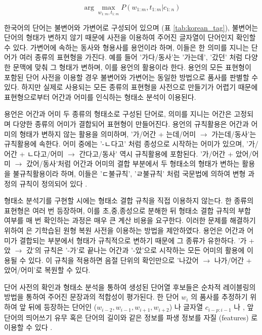 \documentclass[oneside, ko,phd]{snuthesis_utf8_kor}
\begin{document}
\begin{equation}
\label{eq:korean_pos_obj}
\arg \max_{w_{1:m},t_{1:m}} P(w_{1:m}, t_{1:m} \vert c_{1:n})
\end{equation}

한국어의 단어는 불변어와 가변어로 구성되어 있으며 (표 \ref{tab:korean_tag}), 불변어는 단어의 형태가 변하지 않기 때문에 사전을 이용하여 주어진 글자열이 단어인지 확인할 수 있다.
가변어에 속하는 동사와 형용사를 용언이라 하며, 이들은 한 의미를 지니는 단어가 여러 종류의 표현형을 가진다.
예를 들어 '가다/동사'는 '가는데', '갔던' 처럼 다양한 문맥에 맞춰 그 형태가 변하며, 이를 용언의 활용이라 한다.
용언의 모든 표현형이 포함된 단어 사전을 이용할 경우 불변어와 가변어는 동일한 방법으로 품사를 판별할 수 있다.
하지만 실제로 사용되는 모든 종류의 표현형을 사전으로 만들기가 어렵기 때문에 표현형으로부터 어간과 어미를 인식하는 형태소 분석이 이용된다.

용언은 어간과 어미 두 종류의 형태소로 구성된 단어로, 의미를 지니는 어간은 고정되며 다양한 종류의 어미가 결합되어 표현형이 만들어진다.
용언의 규칙활용은 어간과 어미의 형태가 변하지 않는 활용을 의미하며, '가/어간 + 는데/어미 $\rightarrow$ 가는데/동사'는 규칙활용에 속한다.
어미 중에는 '-ㄴ다고' 처럼 종성으로 시작하는 어미가 있으며, '가/어간 + ㄴ다고/어미 $\rightarrow$ 간다고/동사' 역시 규칙활용에 포함된다.
'가/어간 + 았어/어미 $\rightarrow$ 갔어/동사'처럼 어간과 어미의 결합 부분에서 두 형태소의 형태가 변하는 활용을 불규칙활용이라 하며, 이들은 'ㄷ불규칙', 'ㄹ불규칙' 처럼 국문법에 의하여 변형 과정의 규칙이 정의되어 있다 \cite{kang1995syllable}.

형태소 분석기를 구현할 시에는 형태소 결합 규칙을 직접 이용하지 않는다.
한 종류의 표현형은 여러 번 등장하며, 이를 초,중,종성으로 분해한 뒤 형태소 결합 규칙의 부합 여부를 매 번 확인하는 과정은 매우 큰 계산 비용을 요구한다.
이러한 문제를 해결하기 위하여 \cite{shim2013syllable} 은 기학습된 원형 복원 사전을 이용하는 방법을 제안하였다.
용언은 어간과 어미가 결합되는 부분에서 형태가 규칙적으로 변하기 때문에 그 종류가 유한하다.
'가 + 았 $\rightarrow$ 갔'의 규칙은 '-가'로 끝나는 어간과 '-았'으로 시작하는 모든 어미의 활용에 이용될 수 있다.
이 규칙을 적용하면 음절 단위의 확인만으로 '나갔어 $\rightarrow$ 나가/어간 + 았어/어미'로 복원할 수 있다.

단어 사전의 확인과 형태소 분석을 통하여 생성된 단어열 후보들은 순차적 레이블링의 방법을 통하여 주어진 문장과의 적합성이 평가된다.
한 단어 $w_i$ 의 품사를 추정하기 위하여 앞 뒤에 등장하는 단어인 ($w_{i-2}, w_{i-1}, w_{i+1}, w_{i+2}$) 나 글자열 $c_{i-p:i-1}$  나 \cite{lee2013joint}, 앞 단어의 띄어쓰기 유무 혹은 단어의 길이와 같은 정보를 파생 정보를 자질 (features) 로 이용할 수 있다 \cite{na2012crfs}.
\end{document}
